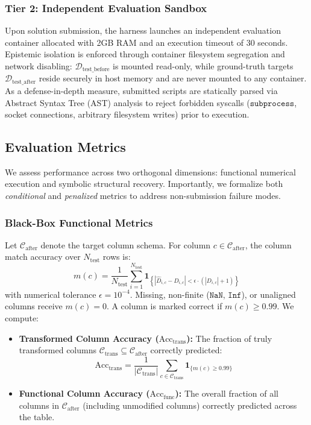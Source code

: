 \documentclass[sigconf]{acmart}
\begin{document}
\subsubsection{Tier 2: Independent Evaluation Sandbox}
Upon solution submission, the harness launches an independent evaluation container allocated with 2GB RAM and an execution timeout of 30 seconds. Epistemic isolation is enforced through container filesystem segregation and network disabling: $\mathcal{D}_{\text{test\_before}}$ is mounted read-only, while ground-truth targets $\mathcal{D}_{\text{test\_after}}$ reside securely in host memory and are never mounted to any container. As a defense-in-depth measure, submitted scripts are statically parsed via Abstract Syntax Tree (AST) analysis to reject forbidden syscalls ($\texttt{subprocess}$, socket connections, arbitrary filesystem writes) prior to execution.


\subsection{Evaluation Metrics}
\label{sec:metrics}
We assess performance across two orthogonal dimensions: functional numerical execution and symbolic structural recovery. Importantly, we formalize both \emph{conditional} and \emph{penalized} metrics to address non-submission failure modes.

\subsubsection{Black-Box Functional Metrics}
Let $\mathcal{C}_{\text{after}}$ denote the target column schema. For column $c \in \mathcal{C}_{\text{after}}$, the column match accuracy over $N_{\text{test}}$ rows is:
\begin{equation}
\label{eq:col_match}
    m(c) = \frac{1}{N_{\text{test}}} \sum_{i=1}^{N_{\text{test}}} \mathbf{1}_{\left\{ |\widehat{D}_{i, c} - D_{i, c}| < \epsilon \cdot (|D_{i, c}| + 1) \right\}}
\end{equation}
with numerical tolerance $\epsilon = 10^{-4}$. Missing, non-finite ($\texttt{NaN}$, $\texttt{Inf}$), or unaligned columns receive $m(c) = 0$. A column is marked correct if $m(c) \ge 0.99$. We compute:
\begin{itemize}
    \item \textbf{Transformed Column Accuracy ($\text{Acc}_{\text{trans}}$):} The fraction of truly transformed columns $\mathcal{C}_{\text{trans}} \subseteq \mathcal{C}_{\text{after}}$ correctly predicted:
    \begin{equation}
    \label{eq:acc_trans}
        \text{Acc}_{\text{trans}} = \frac{1}{|\mathcal{C}_{\text{trans}}|} \sum_{c \in \mathcal{C}_{\text{trans}}} \mathbf{1}_{\{m(c) \ge 0.99\}}
    \end{equation}
    \item \textbf{Functional Column Accuracy ($\text{Acc}_{\text{func}}$):} The overall fraction of all columns in $\mathcal{C}_{\text{after}}$ (including unmodified columns) correctly predicted across the table.
\end{itemize}
\end{document}
